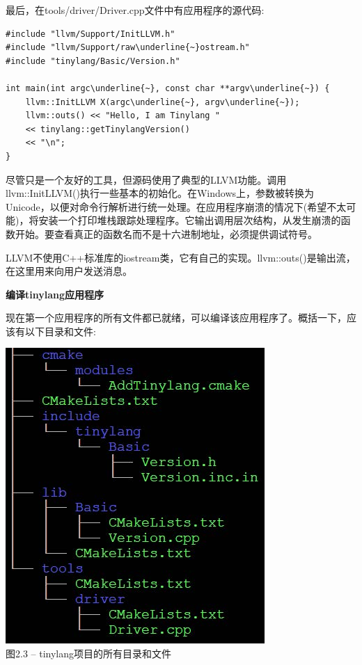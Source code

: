 最后，在tools/driver/Driver.cpp文件中有应用程序的源代码:\par

\begin{lstlisting}[caption={}]
#include "llvm/Support/InitLLVM.h"
#include "llvm/Support/raw\underline{~}ostream.h"
#include "tinylang/Basic/Version.h"

int main(int argc\underline{~}, const char **argv\underline{~}) {
	llvm::InitLLVM X(argc\underline{~}, argv\underline{~});
	llvm::outs() << "Hello, I am Tinylang "
	<< tinylang::getTinylangVersion()
	<< "\n";
}
\end{lstlisting}

尽管只是一个友好的工具，但源码使用了典型的LLVM功能。调用llvm::InitLLVM()执行一些基本的初始化。在Windows上，参数被转换为Unicode，以便对命令行解析进行统一处理。在应用程序崩溃的情况下(希望不太可能)，将安装一个打印堆栈跟踪处理程序。它输出调用层次结构，从发生崩溃的函数开始。要查看真正的函数名而不是十六进制地址，必须提供调试符号。\par

LLVM不使用C++标准库的iostream类，它有自己的实现。llvm::outs()是输出流，在这里用来向用户发送消息。\par

\hspace*{\fill} \par %
\textbf{编译tinylang应用程序}

现在第一个应用程序的所有文件都已就绪，可以编译该应用程序了。概括一下，应该有以下目录和文件:\par

\hspace*{\fill} \par %
\begin{center}
	\includegraphics{content/1/chapter2/images/3.jpg}\\
	图2.3 – tinylang项目的所有目录和文件
\end{center}

